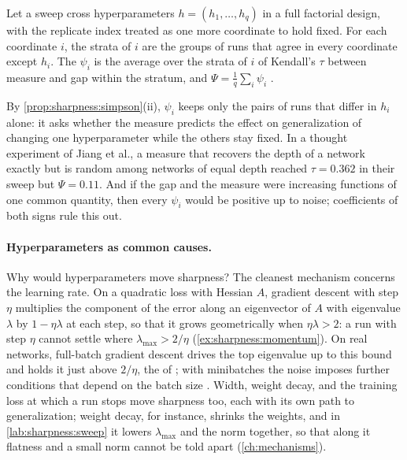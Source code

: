 \begin{refsection}
\begin{definition}\label{def:sharpness:granulated}
Let a sweep cross hyperparameters $h=(h_1,\dots,h_q)$ in a full factorial design, with the replicate index treated as one more coordinate to hold fixed. For each coordinate $i$, the strata of $i$ are the groups of runs that agree in every coordinate except $h_i$. The  $\psi_i$ is the average over the strata of $i$ of Kendall's $\tau$ between measure and gap within the stratum, and $\Psi=\frac1q\sum_i\psi_i$ \parencite{JiangEtAl2020}.
\end{definition}

By \cref{prop:sharpness:simpson}(ii), $\psi_i$ keeps only the pairs of runs that differ in $h_i$ alone: it asks whether the measure predicts the effect on generalization of changing one hyperparameter while the others stay fixed. In a thought experiment of Jiang et al., a measure that recovers the depth of a network exactly but is random among networks of equal depth reached $\tau=0.362$ in their sweep but $\Psi=0.11$. And if the gap and the measure were increasing functions of one common quantity, then every $\psi_i$ would be positive up to noise; coefficients of both signs rule this out.

\paragraph{Hyperparameters as common causes.} Why would hyperparameters move sharpness? The cleanest mechanism concerns the learning rate. On a quadratic loss with Hessian $A$, gradient descent with step $\eta$ multiplies the component of the error along an eigenvector of $A$ with eigenvalue $\lambda$ by $1-\eta\lambda$ at each step, so that it grows geometrically when $\eta\lambda>2$: a run with step $\eta$ cannot settle where $\lambda_{\max}>2/\eta$ (\cref{ex:sharpness:momentum}). On real networks, full-batch gradient descent drives the top eigenvalue up to this bound and holds it just above $2/\eta$, the  of \textcite{CohenEtAl2021}; with minibatches the noise imposes further conditions that depend on the batch size \parencite{WuMaE2018}. Width, weight decay, and the training loss at which a run stops move sharpness too, each with its own path to generalization; weight decay, for instance, shrinks the weights, and in \cref{lab:sharpness:sweep} it lowers $\lambda_{\max}$ and the norm together, so that along it flatness and a small norm cannot be told apart (\cref{ch:mechanisms}).


\end{refsection}
